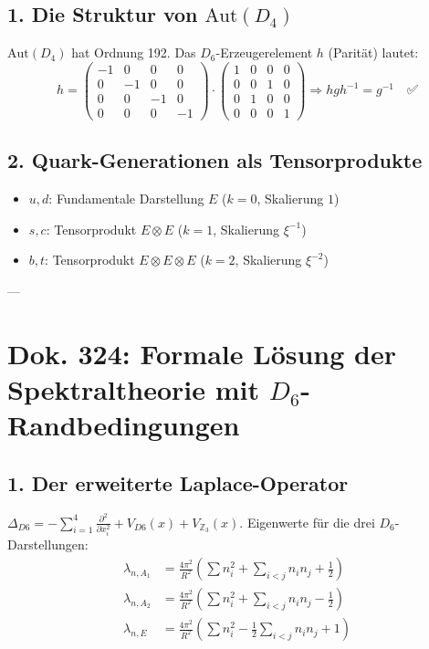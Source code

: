 \documentclass[11pt,a4paper]{article}
\begin{document}
	\subsection{1. Die Struktur von $\text{Aut}(D_4)$}
	$\text{Aut}(D_4)$ hat Ordnung 192. Das $D_6$-Erzeugerelement $h$ (Parität) lautet:
	\begin{equation}
		h = \begin{pmatrix} -1 & 0 & 0 & 0 \\ 0 & -1 & 0 & 0 \\ 0 & 0 & -1 & 0 \\ 0 & 0 & 0 & -1 \end{pmatrix} \cdot \begin{pmatrix} 1 & 0 & 0 & 0 \\ 0 & 0 & 1 & 0 \\ 0 & 1 & 0 & 0 \\ 0 & 0 & 0 & 1 \end{pmatrix} \Rightarrow hgh^{-1} = g^{-1} \quad \text{✅}
	\end{equation}
	
	\subsection{2. Quark-Generationen als Tensorprodukte}
	\begin{itemize}
		\item $u, d$: Fundamentale Darstellung $E$ ($k=0$, Skalierung $1$)
		\item $s, c$: Tensorprodukt $E \otimes E$ ($k=1$, Skalierung $\xi^{-1}$)
		\item $b, t$: Tensorprodukt $E \otimes E \otimes E$ ($k=2$, Skalierung $\xi^{-2}$)
	\end{itemize}
	
	---
	
	\section{Dok. 324: Formale Lösung der Spektraltheorie mit $D_6$-Randbedingungen}
	
	\subsection{1. Der erweiterte Laplace-Operator}
	$\Delta_{D6} = -\sum_{i=1}^4 \frac{\partial^2}{\partial x_i^2} + V_{D6}(x) + V_{\mathbb{Z}_3}(x)$.
	Eigenwerte für die drei $D_6$-Darstellungen:
	\begin{align}
		\lambda_{n,A_1} &= \frac{4\pi^2}{R^2} \left( \sum n_i^2 + \sum_{i<j} n_i n_j + \frac{1}{2} \right) \\
		\lambda_{n,A_2} &= \frac{4\pi^2}{R^2} \left( \sum n_i^2 + \sum_{i<j} n_i n_j - \frac{1}{2} \right) \\
		\lambda_{n,E} &= \frac{4\pi^2}{R^2} \left( \sum n_i^2 - \frac{1}{2}\sum_{i<j} n_i n_j + 1 \right)
	\end{align}
	
\end{document}
